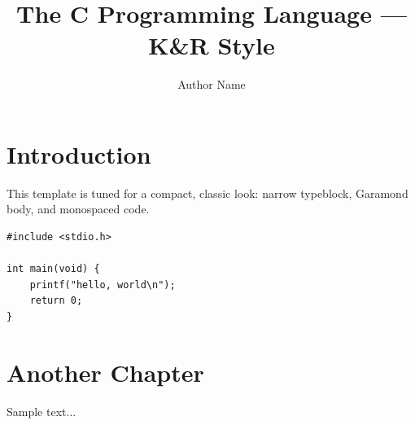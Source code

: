 \documentclass[10pt,twoside]{book}
\title{The C Programming Language — K\&R Style}
\author{Author Name}
\date{}
\begin{document}
\maketitle
\frontmatter
\tableofcontents
\mainmatter

\chapter{Introduction}
This template is tuned for a compact, classic look: narrow typeblock, Garamond body, and monospaced code.

\begin{lstlisting}[language=KRC,caption={Hello world}]
#include <stdio.h>

int main(void) {
    printf("hello, world\n");
    return 0;
}
\end{lstlisting}

\chapter{Another Chapter}
Sample text...
\end{document}
